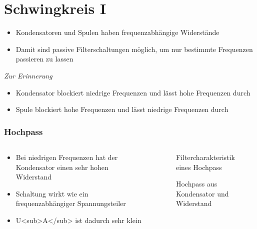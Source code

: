 
\section{Schwingkreis I}
\label{section:schwingkreis_1}
\begin{frame}%
\begin{itemize}
  \item Kondensatoren und Spulen haben frequenzabhängige Widerstände
  \item Damit sind passive Filterschaltungen möglich, um nur bestimmte Frequenzen passieren zu lassen
  \end{itemize}
    \pause
    \emph{Zur Erinnerung}

\begin{itemize}
  \item Kondensator blockiert niedrige Frequenzen und  lässt hohe Frequenzen durch
  \item Spule blockiert hohe Frequenzen und lässt niedrige Frequenzen durch
  \end{itemize}


\end{frame}

\begin{frame}
\frametitle{Hochpass}
\begin{columns}
    \begin{column}{0.48\textwidth}
    \begin{itemize}
  \item Bei niedrigen Frequenzen hat der Kondensator einen sehr hohen Widerstand
  \item Schaltung wirkt wie ein frequenzabhängiger Spannungsteiler
  \item U<sub>A</sub> ist dadurch sehr klein
  \end{itemize}

    \end{column}
   \begin{column}{0.48\textwidth}
       
\begin{figure}
    \caption{\scriptsize Filtercharakteristik eines Hochpass}
    \label{e_hochpass}
\end{figure}


\begin{figure}
    \caption{\scriptsize Hochpass aus Kondensator und Widerstand}
    \label{e_hochpass_rc}
\end{figure}


   \end{column}
\end{columns}

\end{frame}

